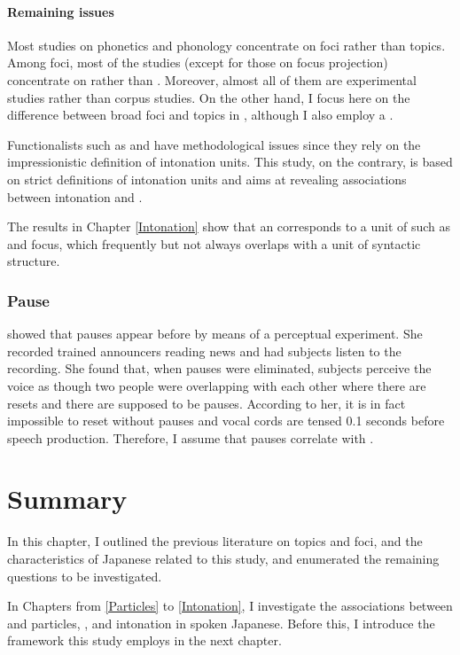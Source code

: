 \paragraph{Remaining issues}

Most studies on phonetics and phonology concentrate on
foci rather than topics.
Among foci, most of the studies (except for those on focus projection) concentrate on  rather than .
Moreover, almost all of them are experimental studies rather than
corpus studies.
On the other hand, I focus here on
the difference between broad foci and topics in ,
although I also employ a .

Functionalists such as  and 
have methodological issues since they rely on the impressionistic definition of intonation units.
This study, on the contrary, is based on
strict definitions of intonation units and
aims at revealing associations between intonation and .

The results in Chapter \ref{Intonation} show that
an  corresponds to a unit of  such as  and focus,
which frequently but not always overlaps with a unit of syntactic structure.

\subsubsection{Pause}

 showed that
pauses appear before  by means of a perceptual experiment.
She recorded trained announcers reading news and had subjects listen to the recording.
She found that, when pauses were eliminated,
subjects perceive the voice as though two people were overlapping with each other where there are  resets and there are supposed to be pauses.
According to her,
it is in fact impossible to reset  without pauses and
vocal cords are tensed 0.1 seconds before speech production.
Therefore, I assume that pauses correlate with .

\section{Summary}

In this chapter,
I outlined the previous literature on topics and foci, and
the characteristics of Japanese related to this study,
and enumerated the remaining questions to be investigated.

In Chapters from \ref{Particles} to \ref{Intonation},
I investigate the associations between  and particles, , and intonation in spoken Japanese.
Before this,
I introduce the framework this study employs in the next chapter.




